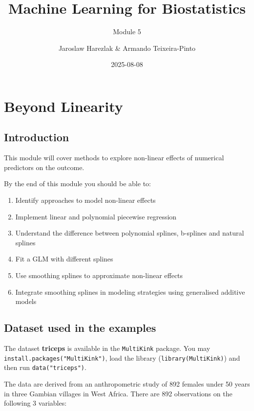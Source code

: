 \documentclass[
]{book}
\title{Machine Learning for Biostatistics}
\subtitle{Module 5}
\author{Jaroslaw Harezlak \& Armando Teixeira-Pinto}
\date{2025-08-08}
\providecommand{\tightlist}{%
  \setlength{\itemsep}{0pt}\setlength{\parskip}{0pt}}
\begin{document}
\maketitle

{
\setcounter{tocdepth}{1}
\tableofcontents
}
\chapter*{Beyond Linearity}\label{beyond-linearity}

\section*{Introduction}\label{introduction}

This module will cover methods to explore non-linear effects of numerical
predictors on the outcome.

By the end of this module you should be able to:

\begin{enumerate}
\def\labelenumi{\arabic{enumi}.}
\tightlist
\item
  Identify approaches to model non-linear effects
\item
  Implement linear and polynomial piecewise regression
\item
  Understand the difference between polynomial splines, b-splines and natural
  splines
\item
  Fit a GLM with different splines
\item
  Use smoothing splines to approximate non-linear effects
\item
  Integrate smoothing splines in modeling strategies using generalised additive models
\end{enumerate}

\section*{Dataset used in the examples}\label{dataset-used-in-the-examples}

The dataset \textbf{triceps} is available in the \texttt{MultiKink} package.
You may \texttt{install.packages("MultiKink")}, load the library (\texttt{library(MultiKink)})
and then run \texttt{data("triceps")}.

The data are derived from an anthropometric study of 892 females under 50 years
in three Gambian villages in West Africa. There are 892 observations
on the following 3 variables:
\end{document}

